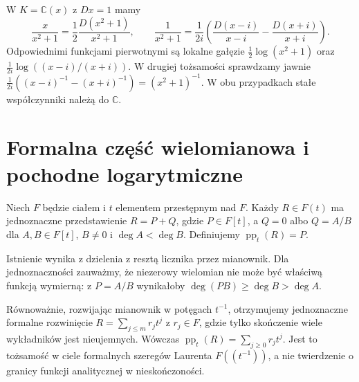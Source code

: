 \begin{przyklad}
\label{aa:prz:liouville-rational}
W $K=\mathbb C(x)$ z $Dx=1$ mamy
\[
 \frac{x}{x^2+1}=\frac12\frac{D(x^2+1)}{x^2+1},
 \qquad
 \frac1{x^2+1}
 =\frac1{2i}\left(\frac{D(x-i)}{x-i}
                   -\frac{D(x+i)}{x+i}\right).
\]
Odpowiednimi funkcjami pierwotnymi są lokalne gałęzie
$\frac12\log(x^2+1)$ oraz
$\frac1{2i}\log((x-i)/(x+i))$.
W drugiej tożsamości sprawdzamy jawnie
$\frac1{2i}((x-i)^{-1}-(x+i)^{-1})=(x^2+1)^{-1}$.
W obu przypadkach stałe współczynniki należą do $\mathbb C$.
\end{przyklad}

\section{Formalna część wielomianowa i pochodne logarytmiczne}

\begin{definicja}
\label{aa:def:liouville-polynomial-part}
Niech $F$ będzie ciałem i $t$ elementem przestępnym nad $F$.
Każdy $R\in F(t)$ ma jednoznaczne przedstawienie
$R=P+Q$, gdzie $P\in F[t]$, a $Q=0$ albo
$Q=A/B$ dla $A,B\in F[t]$, $B\ne0$ i $\deg A<\deg B$.
Definiujemy $\operatorname{pp}_t(R)=P$.
\end{definicja}

Istnienie wynika z dzielenia z resztą licznika przez mianownik.
Dla jednoznaczności zauważmy, że niezerowy wielomian nie może
być właściwą funkcją wymierną: z $P=A/B$ wynikałoby
$\deg(PB)\ge\deg B>\deg A$.

Równoważnie, rozwijając mianownik w potęgach $t^{-1}$,
otrzymujemy jednoznaczne formalne rozwinięcie
$R=\sum_{j\le m}r_jt^j$ z $r_j\in F$,
gdzie tylko skończenie wiele wykładników jest nieujemnych.
Wówczas $\operatorname{pp}_t(R)=\sum_{j\ge0}r_jt^j$.
Jest to tożsamość w ciele formalnych szeregów Laurenta
$F((t^{-1}))$, a nie twierdzenie o granicy funkcji
analitycznej w nieskończoności.

